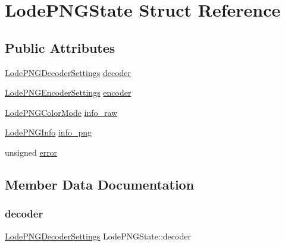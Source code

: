 \hypertarget{struct_lode_p_n_g_state}{}\section{Lode\+P\+N\+G\+State Struct Reference}
\label{struct_lode_p_n_g_state}
\subsection*{Public Attributes}
\begin{DoxyCompactItemize}
\item 
\mbox{\hyperlink{struct_lode_p_n_g_decoder_settings}{Lode\+P\+N\+G\+Decoder\+Settings}} \mbox{\hyperlink{struct_lode_p_n_g_state_abd2c38ffc68f04b0e4159e1f97ba1f76}{decoder}}
\item 
\mbox{\hyperlink{struct_lode_p_n_g_encoder_settings}{Lode\+P\+N\+G\+Encoder\+Settings}} \mbox{\hyperlink{struct_lode_p_n_g_state_ac63d91db835129d02eb83bbe81de347e}{encoder}}
\item 
\mbox{\hyperlink{struct_lode_p_n_g_color_mode}{Lode\+P\+N\+G\+Color\+Mode}} \mbox{\hyperlink{struct_lode_p_n_g_state_a597bc08de787147474d43adf8b6ceacf}{info\+\_\+raw}}
\item 
\mbox{\hyperlink{struct_lode_p_n_g_info}{Lode\+P\+N\+G\+Info}} \mbox{\hyperlink{struct_lode_p_n_g_state_a08d9ac43c995fcf34d72b1d37047b6fa}{info\+\_\+png}}
\item 
unsigned \mbox{\hyperlink{struct_lode_p_n_g_state_a1a00a050da588cf3c2b7a6252bebb0cd}{error}}
\end{DoxyCompactItemize}


\subsection{Member Data Documentation}
\mbox{\label{struct_lode_p_n_g_state_abd2c38ffc68f04b0e4159e1f97ba1f76}} 
\subsubsection{\texorpdfstring{decoder}{decoder}}
{\footnotesize\ttfamily \mbox{\hyperlink{struct_lode_p_n_g_decoder_settings}{Lode\+P\+N\+G\+Decoder\+Settings}} Lode\+P\+N\+G\+State\+::decoder}

\mbox{\label{struct_lode_p_n_g_state_ac63d91db835129d02eb83bbe81de347e}} 
